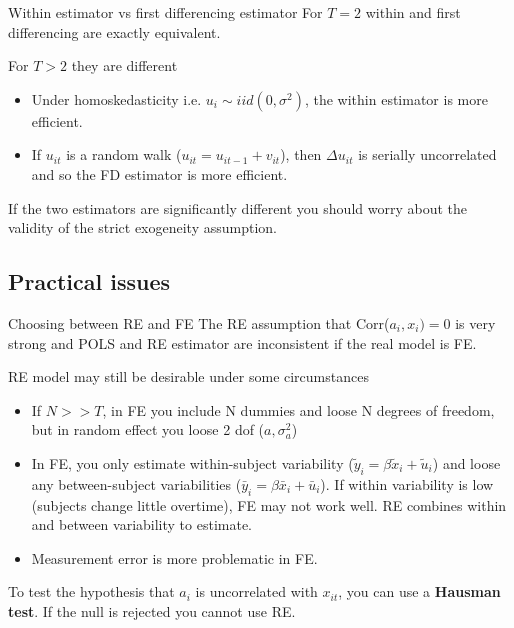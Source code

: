 \documentclass{beamer}
\begin{document}
\begin{frame}{Within estimator vs first differencing estimator}
For $T = 2$ within and first differencing are exactly equivalent.\bigskip

For $T> 2$ they are different
\begin{itemize}
\item Under homoskedasticity i.e. $u_i\sim iid(0,\sigma^2)$, the within estimator is more efficient. 
\item If $u_{it}$ is a random walk ($u_{it}=u_{it-1}+v_{it}$), then $\Delta u_{it}$ is serially uncorrelated and so the FD estimator is more efficient.
\end{itemize}\medskip

If the two estimators are significantly different you should worry about the validity of the strict exogeneity assumption.
\end{frame}

\subsection{Practical issues}
\begin{frame}{Choosing between RE and FE}
The RE assumption that Corr($a_i,x_i)=0$ is very strong and 
POLS and RE estimator are inconsistent if the real model is FE.\medskip

RE model may still be desirable under some circumstances
\begin{itemize}
\item If $N >>T$, in FE you include N dummies and loose N degrees of freedom, but in random effect you loose 2 dof ($a,\sigma^2_a$)
\item In FE, you only estimate within-subject variability ($\tilde{y}_i=\beta\tilde{x}_i+\tilde{u}_i$) and loose any between-subject variabilities ($\bar{y}_i=\beta\bar{x}_i+\bar{u}_i$). If within variability is low (subjects change little overtime), FE may not work well. RE combines within and between variability to estimate.
\item Measurement error is more problematic in FE.
\end{itemize}

To test the hypothesis that $a_i$ is uncorrelated with $x_{it}$, you can use a \textbf{Hausman test}. If the null is rejected you cannot use RE.
\end{frame}
\end{document}
